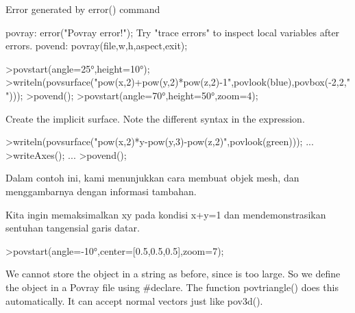 \documentclass[a4paper,10pt]{article}
\begin{document}
\begin{eulernotebook}
\begin{euleroutput}
  Error generated by error() command
  
  povray:
      error("Povray error!");
  Try "trace errors" to inspect local variables after errors.
  povend:
      povray(file,w,h,aspect,exit); 
\end{euleroutput}
\begin{eulerprompt}
>povstart(angle=25°,height=10°); 
>writeln(povsurface("pow(x,2)+pow(y,2)*pow(z,2)-1",povlook(blue),povbox(-2,2,"")));
>povend();
>povstart(angle=70°,height=50°,zoom=4);
\end{eulerprompt}
\begin{eulercomment}
Create the implicit surface. Note the different syntax in the
expression.
\end{eulercomment}
\begin{eulerprompt}
>writeln(povsurface("pow(x,2)*y-pow(y,3)-pow(z,2)",povlook(green))); ...
>writeAxes(); ...
>povend();
\end{eulerprompt}
\begin{eulercomment}
Dalam contoh ini, kami menunjukkan cara membuat objek mesh, dan
menggambarnya dengan informasi tambahan.

Kita ingin memaksimalkan xy pada kondisi x+y=1 dan mendemonstrasikan
sentuhan tangensial garis datar.
\end{eulercomment}
\begin{eulerprompt}
>povstart(angle=-10°,center=[0.5,0.5,0.5],zoom=7);
\end{eulerprompt}
\begin{eulercomment}
We cannot store the object in a string as before, since is too large. So we define the object in a Povray file using
#declare. The function povtriangle() does this automatically. It can accept normal vectors just like pov3d().


\end{eulercomment}
\end{eulernotebook}
\end{document}
